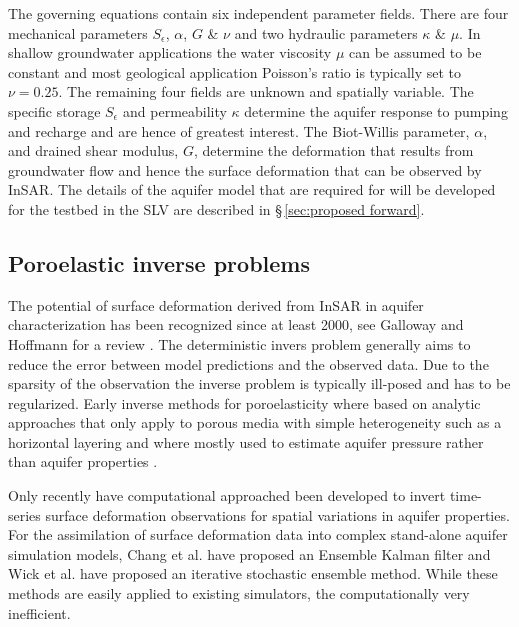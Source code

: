 \documentclass[11pt,final]{article}%
\newcommand{\Stor}{S_{\epsilon}}
\begin{document}
The governing equations contain six independent parameter fields. There are four mechanical parameters $\Stor$, $\alpha$, $G$ \& $\nu$ and two hydraulic parameters $\kappa$ \& $\mu$. In shallow groundwater applications the water viscosity $\mu$ can be assumed to be constant and most geological application Poisson's ratio is typically set to $\nu = 0.25$. The remaining four fields are unknown and spatially variable. The specific storage $\Stor$ and permeability $\kappa$ determine the aquifer response to pumping and recharge and are hence of greatest interest. The Biot-Willis parameter, $\alpha$, and drained shear modulus, $G$, determine the deformation that results from groundwater flow and hence the surface deformation that can be observed by InSAR. The details of the aquifer model that are required for will be developed for the testbed in the SLV are described in \S\,\ref{sec:proposed forward}. 

\subsection{Poroelastic inverse problems}
The potential of surface deformation derived from InSAR in aquifer characterization has been recognized since at least 2000, see Galloway and Hoffmann for a review
\cite{Galloway2017}. The deterministic invers problem generally aims to reduce the error between model predictions and the observed data. Due to the sparsity of the observation the inverse problem is typically ill-posed and has to be regularized. Early inverse methods for poroelasticity where based on analytic approaches that only apply to porous media with simple heterogeneity such as a horizontal layering and where mostly used to estimate aquifer pressure rather than aquifer properties \cite{Du2001,Vasco2001,Vasco2008,Vasco2010}. 

Only recently have computational approached been developed to invert time-series surface deformation observations for spatial variations in aquifer properties.  For the assimilation of surface deformation data into complex stand-alone aquifer simulation models, Chang et al. \cite{Chang2010} have proposed an Ensemble Kalman filter and Wick et al. \cite{Wick2013} have proposed an iterative stochastic ensemble method. While these methods are easily applied to existing simulators, the computationally very inefficient.
\end{document}
